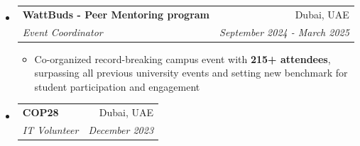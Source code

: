\documentclass[a4paper,20pt]{article}
\makeatletter
\newcommand{\resumeItemWithoutTitle}[1] {
	\item\small{
		{#1 \vspace{-2pt}}
	}
}
\newcommand{\resumeSubheading}[4] {
	\vspace{-1pt}\item
	\begin{tabular*}{0.97\textwidth}{l@{\extracolsep{\fill}}r}
		\textbf{#1} & #2 \\
		\textit{#3} & \textit{#4} \\
	\end{tabular*}\vspace{-5pt}
}
\newcommand{\resumeSubHeadingListStart}{\begin{itemize}[leftmargin=*]}
\newcommand{\resumeSubHeadingListEnd}{\end{itemize}}
\newcommand{\resumeItemListStart}{\begin{itemize}}
\newcommand{\resumeItemListEnd}{\end{itemize}\vspace{-5pt}}
\makeatother
\begin{document}
    \resumeSubHeadingListStart
		\resumeSubheading{{WattBuds - Peer Mentoring program}}{Dubai, UAE}{Event Coordinator}{September 2024 - March 2025}
		\resumeItemListStart
		\resumeItemWithoutTitle{Co-organized record-breaking campus event with \textbf{215+ attendees}, surpassing all previous university events and setting new benchmark for student participation and engagement}
		\resumeItemListEnd
	\resumeSubHeadingListEnd

    \resumeSubHeadingListStart
		\resumeSubheading{{COP28}}{Dubai, UAE}{IT Volunteer}{December 2023}
	\resumeSubHeadingListEnd

    \vspace*{\fill}
\end{document}
